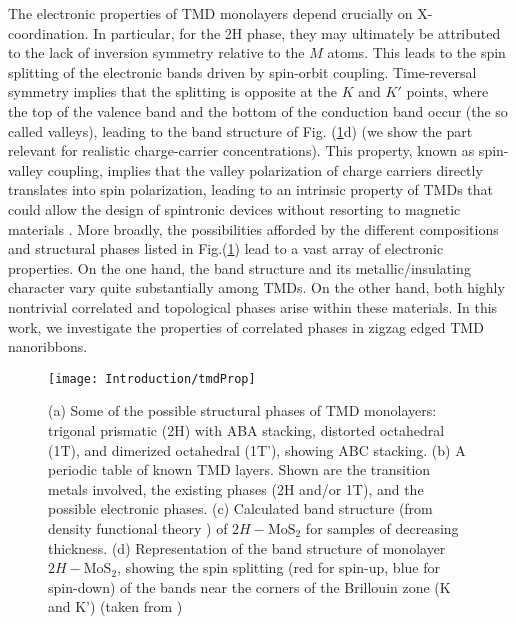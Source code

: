 The electronic properties of \ac{TMD} monolayers depend crucially on $\text{X}$-coordination.
In particular, for the 2H phase, they may ultimately be attributed to the lack of inversion symmetry relative to the $M$ atoms.
This leads to the spin splitting of the electronic bands driven by spin-orbit coupling.
Time-reversal symmetry implies that the splitting is opposite at the $K$ and $K'$ points, where the top of the valence band and the bottom of the conduction band occur (the so called valleys), leading to the band structure of Fig. (\ref{fig:tmdProp}d) (we show the part relevant for realistic charge-carrier concentrations).
This property, known as spin-valley coupling, implies that the valley polarization of charge carriers directly translates into spin polarization, leading to an intrinsic property of \acp{TMD} that could allow the design of spintronic devices without resorting to magnetic materials \cite{manzeli_2d_2017}.
More broadly, the possibilities afforded by the different compositions and structural phases listed in Fig.(\ref{fig:tmdProp}) lead to a vast array of electronic properties.
On the one hand, the band structure and its metallic/insulating character vary quite substantially among \acp{TMD}.
On the other hand, both highly nontrivial  correlated and topological phases arise within these materials.
In this work, we investigate the properties of correlated phases in zigzag edged \ac{TMD} nanoribbons.
\begin{figure}[H]
\centering
\texttt{[image: Introduction/tmdProp]}
 \caption[Structure and electronic properties of \ac{TMD} monolayers.]{(a) Some of the possible structural phases of \ac{TMD} monolayers: trigonal prismatic (2H) with ABA stacking, distorted octahedral (1T), and dimerized octahedral (1T'), showing ABC stacking. (b) A periodic table of known \ac{TMD} layers. Shown are the transition metals involved, the existing phases (2H and/or 1T), and the possible electronic phases. (c) Calculated band structure (from density functional theory \cite{splendiani_emerging_2010}) of $2H-\text{Mo}\text{S}_2$ for samples of decreasing thickness. (d) Representation of the band structure of monolayer $2H-\text{Mo}\text{S}_2$, showing the spin splitting (red for spin-up, blue for spin-down) of the bands near the corners of the Brillouin zone (K and K') (taken from \cite{manzeli_2d_2017}) \label{fig:tmdProp}}
\end{figure}

